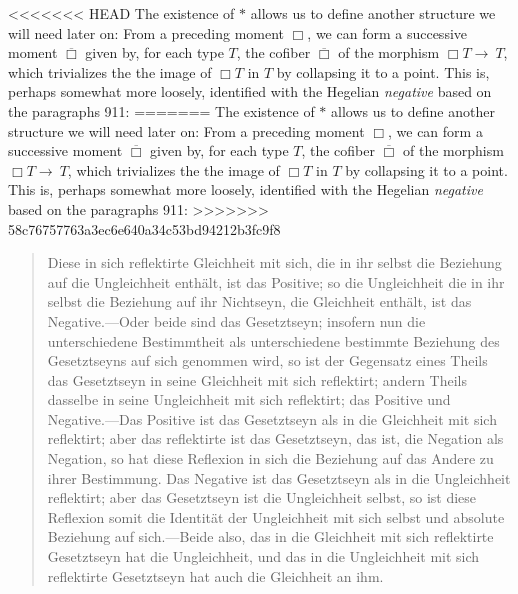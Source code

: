 \documentclass{article}
\begin{document}
<<<<<<< HEAD
The existence of $*$ allows us to define another structure we will need later on: From a preceding moment 
$\Box$, we can form a successive moment $\overline{\Box}$ given by, for each type $T$, the cofiber 
$\overline{\Box}$ of the morphism $\Box T\rightarrow\ T$, which trivializes the the image of $\Box T$ in $T$ 
by collapsing it to a point. This is, perhaps somewhat more loosely, identified with the Hegelian 
\emph{negative} based on the paragraphs 911:
=======
The existence of $*$ allows us to define another structure we will need later on: From a preceding moment
$\Box$, we can form a successive moment $\overline{\Box}$ given by, for each type $T$, the cofiber $\overline{\Box}$
of the morphism $\Box T\rightarrow\ T$, which trivializes the the image of $\Box T$ in $T$ by collapsing
it to a point. This is, perhaps somewhat more loosely, identified with the Hegelian \emph{negative} based
on the paragraphs 911:
>>>>>>> 58c76757763a3ec6e640a34c53bd94212b3fc9f8

\begin{quote}
    Diese in sich reflektirte Gleichheit mit sich, die in ihr selbst die Beziehung auf die Ungleichheit
enthält, ist das Positive; so die Ungleichheit die in ihr selbst die Beziehung auf ihr Nichtseyn, die
Gleichheit enthält, ist das Negative.—Oder beide sind das Gesetztseyn; insofern nun die unterschiedene
Bestimmtheit als unterschiedene bestimmte Beziehung des Gesetztseyns auf sich genommen wird, so ist der
Gegensatz eines Theils das Gesetztseyn in seine Gleichheit mit sich reflektirt; andern Theils dasselbe
in seine Ungleichheit mit sich reflektirt; das Positive und Negative.—Das Positive ist das Gesetztseyn
als in die Gleichheit mit sich reflektirt; aber das reflektirte ist das Gesetztseyn, das ist, die Negation
als Negation, so hat diese Reflexion in sich die Beziehung auf das Andere zu ihrer Bestimmung. Das Negative
ist das Gesetztseyn als in die Ungleichheit reflektirt; aber das Gesetztseyn ist die Ungleichheit selbst,
so ist diese Reflexion somit die Identität der Ungleichheit mit sich selbst und absolute Beziehung auf
sich.—Beide also, das in die Gleichheit mit sich reflektirte Gesetztseyn hat die Ungleichheit, und das
in die Ungleichheit mit sich reflektirte Gesetztseyn hat auch die Gleichheit an ihm.
\end{quote}
\end{document}
